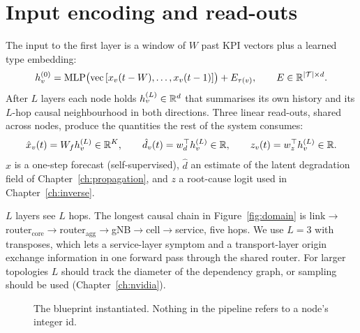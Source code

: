 \section{Input encoding and read-outs}
The input to the first layer is a window of $W$ past KPI vectors plus a learned type embedding:
\begin{equation}
h_v^{(0)}=\mathrm{MLP}\big(\mathrm{vec}\,[x_v(t-W),\dots,x_v(t-1)]\big)+E_{\tau(v)},
\qquad E\in\mathbb{R}^{|\mathcal{T}|\times d}.
\label{eq:input}
\end{equation}
After $L$ layers each node holds $h_v^{(L)}\in\mathbb{R}^d$ that summarises its own history and its
$L$-hop causal neighbourhood in both directions. Three linear read-outs, shared across nodes,
produce the quantities the rest of the system consumes:
\begin{equation}
\hat x_v(t)=W_f h_v^{(L)}\in\mathbb{R}^K,\qquad
\hat d_v(t)=w_d^{\top}h_v^{(L)}\in\mathbb{R},\qquad
z_v(t)=w_z^{\top}h_v^{(L)}\in\mathbb{R}.
\label{eq:heads}
\end{equation}
$\hat x$ is a one-step forecast (self-supervised), $\hat d$ an estimate of the latent degradation
field of Chapter~\ref{ch:propagation}, and $z$ a root-cause logit used in Chapter~\ref{ch:inverse}.

\begin{remark}
$L$ layers see $L$ hops. The longest causal chain in Figure~\ref{fig:domain} is
link$\to$router$_\text{core}$$\to$router$_\text{agg}$$\to$gNB$\to$cell$\to$service, five hops. We use
$L=3$ with transposes, which lets a service-layer symptom and a transport-layer origin exchange
information in one forward pass through the shared router. For larger topologies $L$ should track
the diameter of the dependency graph, or sampling should be used (Chapter~\ref{ch:nvidia}).
\end{remark}

\begin{figure}[h]
\centering
{}
\caption{The blueprint instantiated. Nothing in the pipeline refers to a node's integer id.}
\end{figure}
